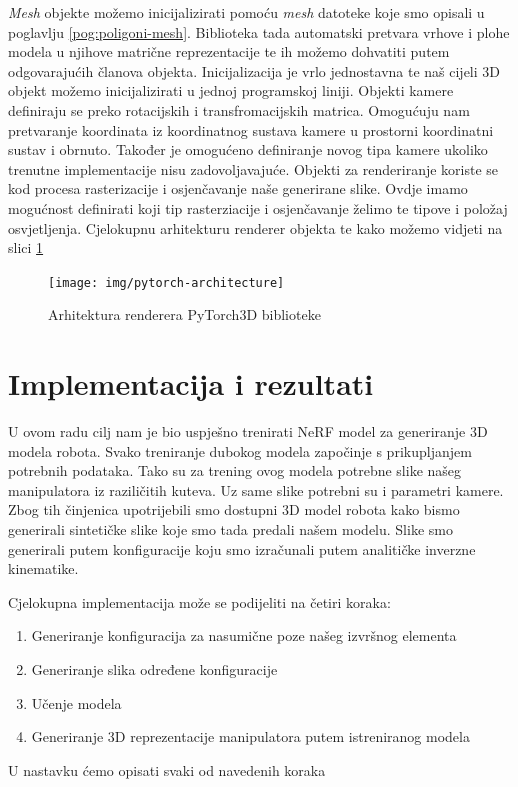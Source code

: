 \documentclass[times, utf8, diplomskirad]{fer}
\begin{document}
\textit{Mesh} objekte možemo inicijalizirati pomoću \textit{mesh} datoteke koje smo opisali u poglavlju \ref{pog:poligoni-mesh}.
Biblioteka tada automatski pretvara vrhove i plohe modela u njihove matrične reprezentacije te ih možemo dohvatiti putem odgovarajućih članova objekta.
Inicijalizacija je vrlo jednostavna te naš cijeli 3D objekt možemo inicijalizirati u jednoj programskoj liniji.
Objekti kamere definiraju se preko rotacijskih i transfromacijskih matrica.
Omogućuju nam pretvaranje koordinata iz koordinatnog sustava kamere u prostorni koordinatni sustav i obrnuto.
Također je omogućeno definiranje novog tipa kamere ukoliko trenutne implementacije nisu zadovoljavajuće.
Objekti za renderiranje koriste se kod procesa rasterizacije i osjenčavanje naše generirane slike.
Ovdje imamo mogućnost definirati koji tip rasterziacije i osjenčavanje želimo te tipove i položaj osvjetljenja.
Cjelokupnu arhitekturu renderer objekta te kako možemo vidjeti na slici \ref{fig:pytorch-architecture}

\begin{figure}[H]
    \centering
    \texttt{[image: img/pytorch-architecture]}
    \caption{Arhitektura renderera PyTorch3D biblioteke}
    \label{fig:pytorch-architecture}
\end{figure}

\chapter{Implementacija i rezultati}
U ovom radu cilj nam je bio uspješno trenirati NeRF model za generiranje 3D modela robota.
Svako treniranje dubokog modela započinje s prikupljanjem potrebnih podataka.
Tako su za trening ovog modela potrebne slike našeg manipulatora iz raziličitih kuteva.
Uz same slike potrebni su i parametri kamere.
Zbog tih činjenica upotrijebili smo dostupni 3D model robota kako bismo generirali sintetičke slike koje smo tada predali našem modelu.
Slike smo generirali putem konfiguracije koju smo izračunali putem analitičke inverzne kinematike.

\noindent Cjelokupna implementacija može se podijeliti na četiri koraka:
\begin{enumerate}
    \item Generiranje konfiguracija za nasumične poze našeg izvršnog elementa
    \item Generiranje slika određene konfiguracije
    \item Učenje modela
    \item Generiranje 3D reprezentacije manipulatora putem istreniranog modela
\end{enumerate}
U nastavku ćemo opisati svaki od navedenih koraka
\end{document}
